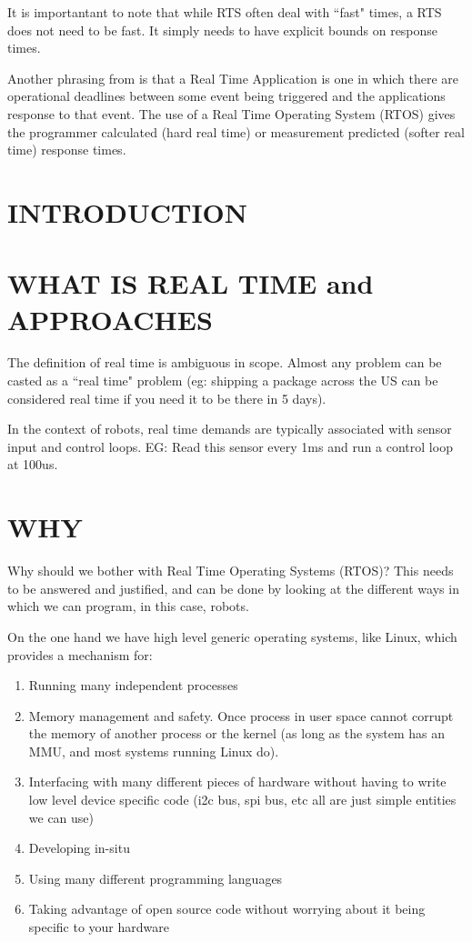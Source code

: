 \documentclass{article}
\begin{document}
It is importantant to note that while RTS often deal with ``fast" times, a RTS does not need to be fast.  It simply needs to have explicit bounds on response times.

Another phrasing from \cite{RealTimeLinux} is that a Real Time Application is one in which there are operational deadlines between some event being triggered and the applications response to that event.  The use of a Real Time Operating System (RTOS) gives the programmer calculated (hard real time) or measurement predicted (softer real time) response times.

\section{INTRODUCTION}
\section{WHAT IS REAL TIME and APPROACHES}
The definition of real time is ambiguous in scope.  Almost any problem can be casted as a ``real time" problem (eg: shipping a package across the US can be considered real time if you need it to be there in 5 days).  

In the context of robots, real time demands are typically associated with sensor input and control loops.  EG: Read this sensor every 1ms and run a control loop at 100us.
\section{WHY}
Why should we bother with Real Time Operating Systems (RTOS)?  This needs to be answered and justified, and can be done by looking at the different ways in which we can program, in this case, robots.  

On the one hand we have high level generic operating systems, like Linux, which provides a mechanism for:
\begin{enumerate}
\item Running many independent processes
\item Memory management and safety.  Once process in user space cannot corrupt the memory of another process or the kernel (as long as the system has an MMU, and most systems running Linux do).
\item Interfacing with many different pieces of hardware without having to write low level device specific code (i2c bus, spi bus, etc all are just simple entities we can use)
\item Developing in-situ
\item Using many different programming languages
\item Taking advantage of open source code without worrying about it being specific to your hardware 
\end{enumerate}
\end{document}
